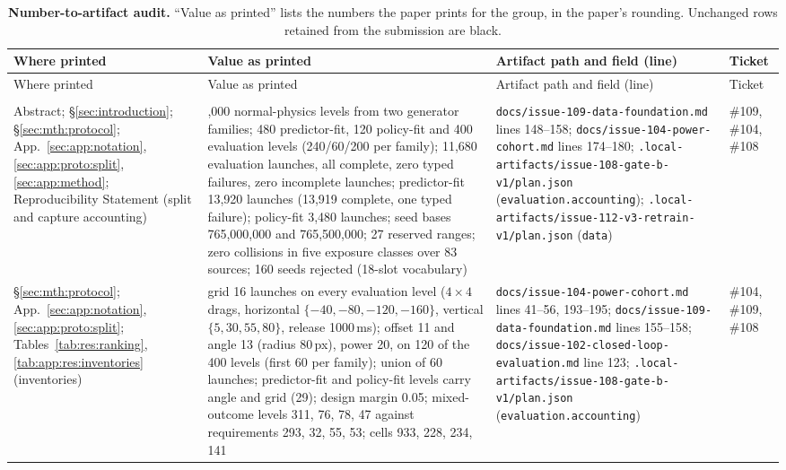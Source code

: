 {\footnotesize
\setlength{\tabcolsep}{3pt}
\protected\def\_{\textunderscore\allowbreak}
\begin{revblock}
\begin{longtable}{@{}>{\raggedright\arraybackslash}p{}>{\raggedright\arraybackslash}p{}>{\raggedright\arraybackslash}p{}>{\raggedright\arraybackslash}p{}@{}}
\caption{\textbf{Number-to-artifact audit.} ``Value as printed'' lists the numbers the paper prints for the group, in the paper's rounding. Unchanged rows retained from the submission are black.}\label{tab:app:audit}\\
\toprule
Where printed & Value as printed & Artifact path and field (line) & Ticket \\
\midrule
\endfirsthead
\toprule
Where printed & Value as printed & Artifact path and field (line) & Ticket \\
\midrule
\endhead
\bottomrule
\endfoot
\multicolumn{4}{@{}l}{\emph{Protocol, split and model (Abstract, Sections~\ref{sec:introduction}--\ref{sec:mth:protocol}, Appendices~\ref{sec:app:notation}--\ref{sec:app:method})}} \\
Abstract; \S\ref{sec:introduction}; \S\ref{sec:mth:protocol}; App.~\ref{sec:app:notation}, \ref{sec:app:proto:split}, \ref{sec:app:method}; Reproducibility Statement (split and capture accounting) & 1,000 normal-physics levels from two generator families; 480 predictor-fit, 120 policy-fit and 400 evaluation levels (240/60/200 per family); 11,680 evaluation launches, all complete, zero typed failures, zero incomplete launches; predictor-fit 13,920 launches (13,919 complete, one typed failure); policy-fit 3,480 launches; seed bases 765,000,000 and 765,500,000; 27 reserved ranges; zero collisions in five exposure classes over 83 sources; 160 seeds rejected (18-slot vocabulary) & \nolinkurl{docs/issue-109-data-foundation.md} lines 148--158; \nolinkurl{docs/issue-104-power-cohort.md} lines 174--180; \nolinkurl{.local-artifacts/issue-108-gate-b-v1/plan.json} (\nolinkurl{evaluation.accounting}); \nolinkurl{.local-artifacts/issue-112-v3-retrain-v1/plan.json} (\nolinkurl{data}) & \#109, \#104, \#108 \\
\S\ref{sec:mth:protocol}; App.~\ref{sec:app:notation}, \ref{sec:app:proto:split}; Tables~\ref{tab:res:ranking}, \ref{tab:app:res:inventories} (inventories) & grid 16 launches on every evaluation level ($4\times4$ drags, horizontal $\{-40,-80,-120,-160\}$, vertical $\{5,30,55,80\}$, release 1000\,ms); offset 11 and angle 13 (radius 80\,px), power 20, on 120 of the 400 levels (first 60 per family); union of 60 launches; predictor-fit and policy-fit levels carry angle and grid (29); design margin 0.05; mixed-outcome levels 311, 76, 78, 47 against requirements 293, 32, 55, 53; cells 933, 228, 234, 141 & \nolinkurl{docs/issue-104-power-cohort.md} lines 41--56, 193--195; \nolinkurl{docs/issue-109-data-foundation.md} lines 155--158; \nolinkurl{docs/issue-102-closed-loop-evaluation.md} line 123; \nolinkurl{.local-artifacts/issue-108-gate-b-v1/plan.json} (\nolinkurl{evaluation.accounting}) & \#104, \#109, \#108 \\

\end{longtable}
\end{revblock}}
